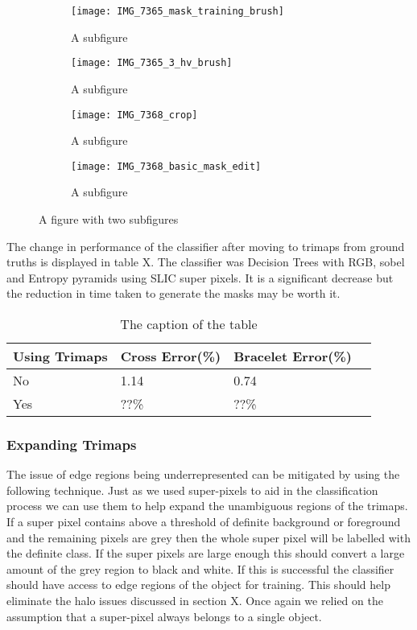 \documentclass[12pt]{IIBproject}
\begin{document}
\begin{figure}[H]
\centering
\begin{subfigure}{.45\textwidth}
  \centering
  \texttt{[image: IMG\_7365\_mask\_training\_brush]}
  \caption{A subfigure}
  \label{fig:sub1}
\end{subfigure}%
\begin{subfigure}{.45\textwidth}
  \centering
  \texttt{[image: IMG\_7365\_3\_hv\_brush]}
  \caption{A subfigure}
  \label{fig:sub2}
\end{subfigure}
\begin{subfigure}{.45\textwidth}
  \centering
  \texttt{[image: IMG\_7368\_crop]}
  \caption{A subfigure}
  \label{fig:sub2}
\end{subfigure}
\begin{subfigure}{.45\textwidth}
  \centering
  \texttt{[image: IMG\_7368\_basic\_mask\_edit]}
  \caption{A subfigure}
  \label{fig:sub2}
\end{subfigure}
\caption{A figure with two subfigures}
\label{fig:test}
\end{figure}
The change in performance of the classifier after moving to trimaps from ground truths is displayed in table X. The classifier was Decision Trees with RGB, sobel and Entropy pyramids using SLIC super pixels. It is a significant decrease but the reduction in time taken to generate the masks may be worth it.
\begin{table}
\begin{center}
    \begin{tabular}{ | l | l | l | p{5cm} |}
    \hline
    Using Trimaps & Cross Error(\%) & Bracelet Error(\%) \\ \hline
    No & 1.14 & 0.74 \\ \hline
    Yes & ??\% & ??\% \\
    \hline
    
    \end{tabular}
    \caption{The caption of the table}\label{table:somename}
\end{center}
\end{table}




\subsubsection{Expanding Trimaps}
The issue of edge regions being underrepresented can be mitigated by using the following technique. Just as we used super-pixels to aid in the classification process we can use them to help expand the unambiguous regions of the trimaps. If a super pixel contains above a threshold of definite background or foreground and the remaining pixels are grey then the whole super pixel will be labelled with the definite class. If the super pixels are large enough this should convert a large amount of the grey region to black and white. If this is successful the classifier should have access to edge regions of the object for training. This should help eliminate the halo issues discussed in section X. Once again we relied on the assumption that a super-pixel always belongs to a single object.  
\end{document}
